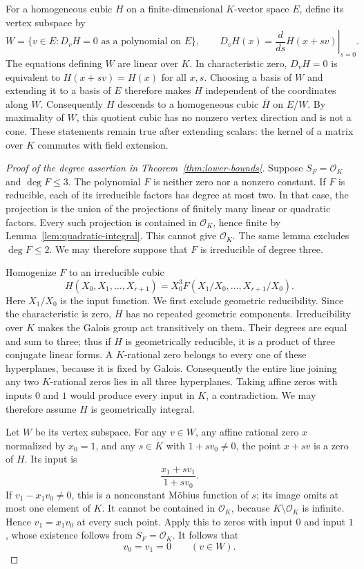 For a homogeneous cubic $H$ on a finite-dimensional $K$-vector space $E$,
define its vertex subspace by
\[
 W=\{v\in E:D_vH=0\text{ as a polynomial on }E\},
 \qquad D_vH(x)=\left.\frac{d}{ds}H(x+sv)\right|_{s=0}.
\]
The equations defining $W$ are linear over $K$.  In characteristic zero,
$D_vH=0$ is equivalent to $H(x+sv)=H(x)$ for all $x,s$.
Choosing a basis of $W$ and extending it to a basis of $E$ therefore makes
$H$ independent of the coordinates along $W$.
Consequently $H$ descends to a homogeneous cubic $\overline H$ on $E/W$.
By maximality of $W$, this quotient cubic has no nonzero vertex direction
and is not a cone.  These statements remain true after extending scalars:
the kernel of a matrix over $K$ commutes with field extension.

\begin{proof}[Proof of the degree assertion in Theorem~\ref{thm:lower-bounds}]
Suppose $S_F=\mathcal O_K$ and $\deg F\le3$.
The polynomial $F$ is neither zero nor a nonzero constant.
If $F$ is reducible, each of its irreducible factors has degree at most two.
In that case, the projection is the union of the
projections of finitely many linear or quadratic factors.  Every such
projection is contained in $\mathcal O_K$, hence finite by
Lemma~\ref{lem:quadratic-integral}.  This cannot give $\mathcal O_K$.
The same lemma excludes $\deg F\le2$.
We may therefore suppose that $F$ is irreducible of degree three.

Homogenize $F$ to an irreducible cubic
\[
 H(X_0,X_1,\ldots,X_{r+1})
      =X_0^3 F(X_1/X_0,\ldots,X_{r+1}/X_0).
\]
Here $X_1/X_0$ is the input function.
We first exclude geometric reducibility.  Since the characteristic is zero,
$H$ has no repeated geometric components.  Irreducibility over $K$ makes
the Galois group act transitively on them.  Their degrees are equal and
sum to three; thus if $H$ is geometrically reducible, it is a product of
three conjugate linear forms.  A $K$-rational zero belongs to every one of
these hyperplanes, because it is fixed by Galois.  Consequently the entire
line joining any two $K$-rational zeros lies in all three hyperplanes.
Taking affine zeros with inputs $0$ and $1$ would produce every input in
$K$, a contradiction.  We may therefore assume $H$ is geometrically
integral.

Let $W$ be its vertex subspace.
For any $v\in W$, any affine rational zero $x$ normalized by $x_0=1$,
and any $s\in K$ with $1+s v_0\neq0$, the point $x+sv$ is a zero of $H$.
Its input is
\[
                       \frac{x_1+s v_1}{1+s v_0}.
\]
If $v_1-x_1v_0\neq0$, this is a nonconstant M\"obius function of $s$;
its image omits at most one element of $K$.  It cannot be contained in
$\mathcal O_K$, because $K\setminus\mathcal O_K$ is infinite.
Hence $v_1=x_1v_0$ at every such point.  Apply this to zeros with input
$0$ and input $1$, whose existence follows from $S_F=\mathcal O_K$.
It follows that
\[
                         v_0=v_1=0\qquad(v\in W).
\]


\end{proof}
